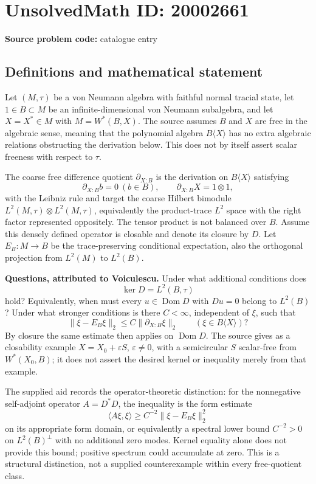 \documentclass[11pt]{article}
\begin{document}
\section*{UnsolvedMath ID: 20002661}
\textbf{Source problem code:} catalogue entry
\subsection{Definitions and mathematical statement}
Let \((M,\tau)\) be a von Neumann algebra with faithful normal tracial state, let \(1\in B\subset M\) be an infinite-dimensional von Neumann subalgebra, and let \(X=X^*\in M\) with \(M=W^*(B,X)\). The source assumes \(B\) and \(X\) are free in the algebraic sense, meaning that the polynomial algebra \(B\langle X\rangle\) has no extra algebraic relations obstructing the derivation below. This does not by itself assert scalar freeness with respect to \(\tau\).

The coarse free difference quotient \(\partial_{X:B}\) is the derivation on \(B\langle X\rangle\) satisfying
\[
 \partial_{X:B}b=0\ (b\in B),\qquad
 \partial_{X:B}X=1\otimes1,
\]
with the Leibniz rule and target the coarse Hilbert bimodule \(L^2(M,\tau)\otimes L^2(M,\tau)\), equivalently the product-trace \(L^2\) space with the right factor represented oppositely. The tensor product is not balanced over \(B\). Assume this densely defined operator is closable and denote its closure by \(D\). Let \(E_B:M\to B\) be the trace-preserving conditional expectation, also the orthogonal projection from \(L^2(M)\) to \(L^2(B)\).

\textbf{Questions, attributed to Voiculescu.} Under what additional conditions does
\[
 \ker D=L^2(B,\tau)
\]
hold? Equivalently, when must every \(u\in\operatorname{Dom}D\) with \(Du=0\) belong to \(L^2(B)\)? Under what stronger conditions is there \(C<\infty\), independent of \(\xi\), such that
\[
 \|\xi-E_B\xi\|_2\le C\|\partial_{X:B}\xi\|_2
       \qquad(\xi\in B\langle X\rangle)?
\]
By closure the same estimate then applies on \(\operatorname{Dom}D\). The source gives as a closability example \(X=X_0+\varepsilon S\), \(\varepsilon\ne0\), with a semicircular \(S\) scalar-free from \(W^*(X_0,B)\); it does not assert the desired kernel or inequality merely from that example.

The supplied aid records the operator-theoretic distinction: for the nonnegative self-adjoint operator \(A=D^*D\), the inequality is the form estimate
\[
 \langle A\xi,\xi\rangle\ge C^{-2}\|\xi-E_B\xi\|_2^2
\]
on its appropriate form domain, or equivalently a spectral lower bound \(C^{-2}>0\) on \(L^2(B)^\perp\) with no additional zero modes. Kernel equality alone does not provide this bound; positive spectrum could accumulate at zero. This is a structural distinction, not a supplied counterexample within every free-quotient class.
\end{document}
